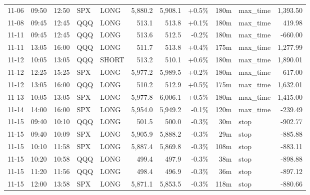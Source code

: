 \documentclass[11pt,a4paper,twoside]{article}
\begin{document}
\begin{center}
\begin{longtable}{>{\color{txtmain}}l l l l l r r r r >{\color{txtmain}}l r}
11-06 & 09:50 & 12:50 & SPX & LONG & 5,880.2 & 5,908.1 & \textcolor{wingreen}{+0.5\%} & 180m & max\_time & \textcolor{wingreen}{1,393.50} \\
11-08 & 09:45 & 12:45 & QQQ & LONG & 513.1 & 513.8 & \textcolor{wingreen}{+0.1\%} & 180m & max\_time & \textcolor{wingreen}{419.98} \\
11-11 & 09:45 & 12:45 & QQQ & LONG & 513.6 & 512.5 & \textcolor{lossred}{-0.2\%} & 180m & max\_time & \textcolor{lossred}{-660.00} \\
11-11 & 13:05 & 16:00 & QQQ & LONG & 511.7 & 513.8 & \textcolor{wingreen}{+0.4\%} & 175m & max\_time & \textcolor{wingreen}{1,277.99} \\
11-12 & 10:05 & 13:05 & QQQ & SHORT & 513.2 & 510.1 & \textcolor{wingreen}{+0.6\%} & 180m & max\_time & \textcolor{wingreen}{1,890.01} \\
11-12 & 12:25 & 15:25 & SPX & LONG & 5,977.2 & 5,989.5 & \textcolor{wingreen}{+0.2\%} & 180m & max\_time & \textcolor{wingreen}{617.00} \\
11-12 & 13:05 & 16:00 & QQQ & LONG & 510.2 & 512.9 & \textcolor{wingreen}{+0.5\%} & 175m & max\_time & \textcolor{wingreen}{1,632.01} \\
11-13 & 10:05 & 13:05 & SPX & LONG & 5,977.8 & 6,006.1 & \textcolor{wingreen}{+0.5\%} & 180m & max\_time & \textcolor{wingreen}{1,415.00} \\
11-14 & 14:00 & 16:00 & SPX & LONG & 5,954.0 & 5,949.2 & \textcolor{lossred}{-0.1\%} & 120m & max\_time & \textcolor{lossred}{-239.49} \\
11-15 & 09:40 & 10:10 & QQQ & LONG & 501.5 & 500.0 & \textcolor{lossred}{-0.3\%} & 30m & stop & \textcolor{lossred}{-902.77} \\
11-15 & 09:40 & 10:09 & SPX & LONG & 5,905.9 & 5,888.2 & \textcolor{lossred}{-0.3\%} & 29m & stop & \textcolor{lossred}{-885.88} \\
11-15 & 10:10 & 11:58 & SPX & LONG & 5,887.4 & 5,869.8 & \textcolor{lossred}{-0.3\%} & 108m & stop & \textcolor{lossred}{-883.11} \\
11-15 & 10:20 & 10:58 & QQQ & LONG & 499.4 & 497.9 & \textcolor{lossred}{-0.3\%} & 38m & stop & \textcolor{lossred}{-898.88} \\
11-15 & 11:20 & 11:56 & QQQ & LONG & 498.4 & 496.9 & \textcolor{lossred}{-0.3\%} & 36m & stop & \textcolor{lossred}{-897.12} \\
11-15 & 12:00 & 13:58 & SPX & LONG & 5,871.1 & 5,853.5 & \textcolor{lossred}{-0.3\%} & 118m & stop & \textcolor{lossred}{-880.66} \\

\end{longtable}
\end{center}
\end{document}
